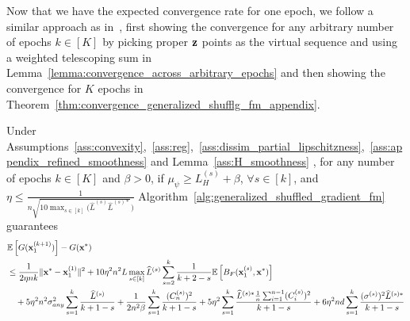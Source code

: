 Now that we have the expected convergence rate for one epoch, we follow a similar approach as in~\cite{liu2024last_iterate_shuffled_gradient}, first showing the convergence for any arbitrary number of epochs $k\in [K]$ by picking proper ${\mathbf{z}}$ points as the virtual sequence and using a weighted telescoping sum in Lemma~\ref{lemma:convergence_across_arbitrary_epochs} and then showing the convergence for $K$ epochs in Theorem~\ref{thm:convergence_generalized_shufflg_fm_appendix}.


\begin{lemma}
\label{lemma:convergence_across_arbitrary_epochs}
    Under Assumptions~\ref{ass:convexity},~\ref{ass:reg},~\ref{ass:dissim_partial_lipschitzness},~\ref{ass:appendix_refined_smoothness} and Lemma~\ref{ass:H_smoothness} , for any number of epochs $k\in [K]$ and $\beta > 0$, 
    if $\mu_{\psi} \geq L_H^{(s)} + \beta$, $\forall s\in [k]$, and $\eta \leq \frac{1}{n\sqrt{10 \max_{s\in[k]} (\widehat{L}^{(s)} \widehat{L}^{(s)*}}) }$
    Algorithm~\ref{alg:generalized_shuffled_gradient_fm} guarantees
    \begin{align}
        &\mathbb{E}\left[G({\mathbf{x}}_1^{(k+1)})\right] - G({\mathbf{x}}^*)\\
        \nonumber
        &\leq \frac{1}{2\eta n k} \| {\mathbf{x}}^* - {\mathbf{x}}_1^{(1)}\|^2 
        + 10 \eta^2 n^2 L\max_{s\in[k]}\widehat{L}^{(s)} \sum_{s=2}^{k} \frac{1}{k+2-s} \mathbb{E}\left[B_F({\mathbf{x}}_1^{(s)}, {\mathbf{x}}^*)\right]\\
        \nonumber
        &\quad + 5\eta^2 n^2 \sigma_{any}^2 \sum_{s=1}^{k} \frac{ \widehat{L}^{(s)} }{k+1-s}
        + \frac{1}{2n^2 \beta}\sum_{s=1}^{k} \frac{ (C_n^{(s)})^2 }{k+1-s}
        + 5\eta^2 \sum_{s=1}^{k} \frac{ \widehat{L}^{(s)*} \frac{1}{n}\sum_{i=1}^{n-1}(C_i^{(s)})^2} {k+1-s}
        + 6\eta^2 nd \sum_{s=1}^{k} \frac{ (\sigma^{(s)})^2 \widehat{L}^{(s)*} }{k+1-s}
    \end{align}

\end{lemma}

